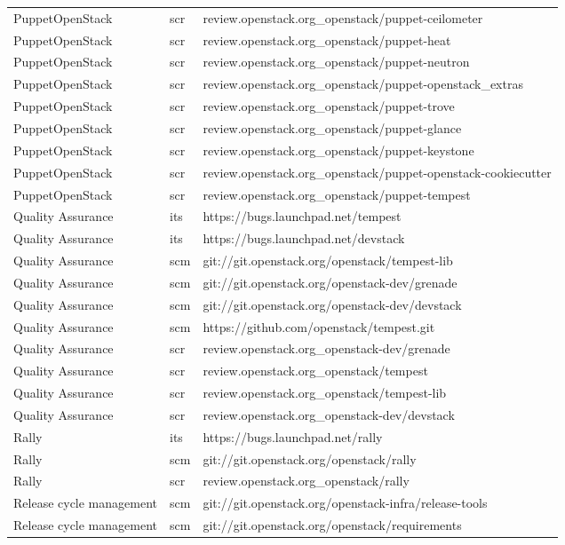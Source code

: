 \begin{center}
\begin{longtable}{|p{4cm}|p{1cm}|p{10cm}|}
PuppetOpenStack&scr&review.openstack.org\_openstack/puppet-ceilometer\\ 
PuppetOpenStack&scr&review.openstack.org\_openstack/puppet-heat\\ 
PuppetOpenStack&scr&review.openstack.org\_openstack/puppet-neutron\\ 
PuppetOpenStack&scr&review.openstack.org\_openstack/puppet-openstack\_extras\\ 
PuppetOpenStack&scr&review.openstack.org\_openstack/puppet-trove\\ 
PuppetOpenStack&scr&review.openstack.org\_openstack/puppet-glance\\ 
PuppetOpenStack&scr&review.openstack.org\_openstack/puppet-keystone\\ 
PuppetOpenStack&scr&review.openstack.org\_openstack/puppet-openstack-cookiecutter\\ 
PuppetOpenStack&scr&review.openstack.org\_openstack/puppet-tempest\\ 
Quality Assurance&its&https://bugs.launchpad.net/tempest\\ 
Quality Assurance&its&https://bugs.launchpad.net/devstack\\ 
Quality Assurance&scm&git://git.openstack.org/openstack/tempest-lib\\ 
Quality Assurance&scm&git://git.openstack.org/openstack-dev/grenade\\ 
Quality Assurance&scm&git://git.openstack.org/openstack-dev/devstack\\ 
Quality Assurance&scm&https://github.com/openstack/tempest.git\\ 
Quality Assurance&scr&review.openstack.org\_openstack-dev/grenade\\ 
Quality Assurance&scr&review.openstack.org\_openstack/tempest\\ 
Quality Assurance&scr&review.openstack.org\_openstack/tempest-lib\\ 
Quality Assurance&scr&review.openstack.org\_openstack-dev/devstack\\ 
Rally&its&https://bugs.launchpad.net/rally\\ 
Rally&scm&git://git.openstack.org/openstack/rally\\ 
Rally&scr&review.openstack.org\_openstack/rally\\ 
Release cycle management&scm&git://git.openstack.org/openstack-infra/release-tools\\ 
Release cycle management&scm&git://git.openstack.org/openstack/requirements\\ 

\end{longtable}
\end{center}
